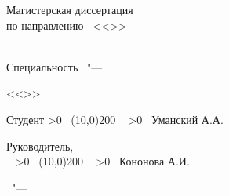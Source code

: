 \begin{center}
{%
Магистерская диссертация \\
по направлению \thesisSpecialtyNumber\ 
<<\thesisSpecialtyTitle>>
}
\\
\textbf {%
\thesisTitle}
\\
{\ProgModule}

\vspace{0pt plus2fill} %

\ifdefined\thesisSpecialtyTwoNumber
{%
Специальность \thesisSpecialtyTwoNumber\ "--- 

<<\thesisSpecialtyTwoTitle>>
}
\fi

\vspace{0pt plus2fill} %
\end{center}
%
\vspace{0pt plus4fill} %
\begin{flushleft}

Студент 
\newcount\lineblank
{}
\loop
  \message{\ }
    \advance {}
    \ifnum \lineblank>0
    \repeat
\
\line(10,0){200} \
\newcount\mynameblank
{}
\loop
  \message{\ }
    \advance {}
    \ifnum \mynameblank>0
    \repeat
\
Уманский А.А. %

Руководитель,\\
\supervisorRegaliaShort
\
\newcount\lineblank
{}
\loop
  \message{\ }
    \advance {}
    \ifnum \lineblank>0
    \repeat
\
\line(10,0){200} \
\newcount\mynameblank
\mynameblank=50
\loop
  \message{\ }
    \advance {}
    \ifnum \mynameblank>0
    \repeat
\
Кононова А.И.

\end{flushleft}

%
\vspace{0pt plus4fill} %
{\centering\thesisCity\ "--- \thesisYear\par}
